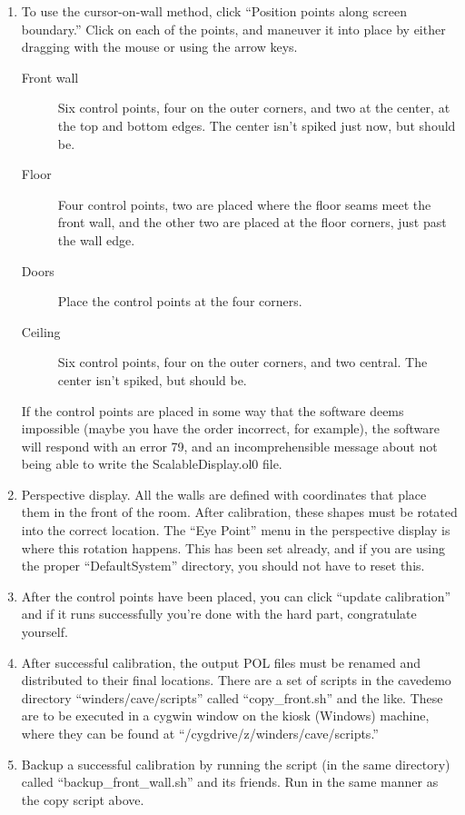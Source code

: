 \documentclass[11pt]{article}
\begin{document}
\begin{enumerate}
\item To use the cursor-on-wall method, click ``Position points along
  screen boundary.''  Click on each of the points, and maneuver it
  into place by either dragging with the mouse or using the arrow keys.

  \begin{description}

  \item[Front wall] Six control points, four on the outer corners, and
    two at the center, at the top and bottom edges.  The center isn't
    spiked just now, but should be.

  \item[Floor] Four control points, two are placed where the floor
    seams meet the front wall, and the other two are placed at the
    floor corners, just past the wall edge.

  \item[Doors] Place the control points at the four corners.

  \item[Ceiling] Six control points, four on the outer corners, and
    two central.  The center isn't spiked, but should be.

  \end{description}

  If the control points are placed in some way that the software deems
  impossible (maybe you have the order incorrect, for example), the
  software will respond with an error 79, and an incomprehensible
  message about not being able to write the ScalableDisplay.ol0 file.

\item Perspective display.  All the walls are defined with coordinates
  that place them in the front of the room.  After calibration, these
  shapes must be rotated into the correct location.  The ``Eye Point''
  menu in the perspective display is where this rotation happens.
  This has been set already, and if you are using the proper
  ``DefaultSystem'' directory, you should not have to reset this.

\item After the control points have been placed, you can click
  ``update calibration'' and if it runs successfully you're done with
  the hard part, congratulate yourself.

\item After successful calibration, the output POL files must be
  renamed and distributed to their final locations.  There are a set
  of scripts in the cavedemo directory ``winders/cave/scripts''
  called ``copy\_front.sh'' and the like.  These are to be executed in
  a cygwin window on the kiosk (Windows) machine, where they can be
  found at ``/cygdrive/z/winders/cave/scripts.''

\item Backup a successful calibration by running the script (in the
  same directory) called ``backup\_front\_wall.sh'' and its friends.
  Run in the same manner as the copy script above.


\end{enumerate}
\end{document}
